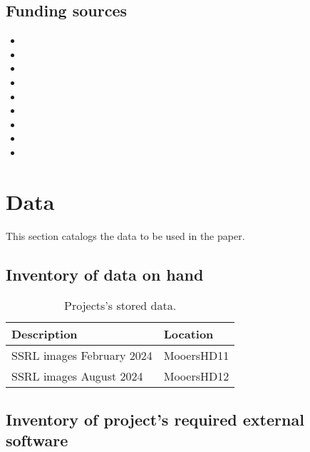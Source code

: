\documentclass[11pt,letterpaper]{article}
\begin{document}
\subsection{Funding sources}
\label{sec:orgbb2e216}

\begin{itemize}
\item 

\item 

\item 

\item 

\item 

\item 

\item 

\item 

\item 
\end{itemize}


\section{Data}
\label{sec:org0693ff0}

This section catalogs the data to be used in the paper.



\subsection{Inventory of data on hand}
\label{sec:org74d0ab8}


\begin{table}[htbp]
\caption[Stored data]{Projects's stored data.}
\centering
\begin{tabular}{ll}
Description & Location\\[0pt]
\hline
SSRL images February 2024 & MooersHD11\\[0pt]
SSRL images August 2024 & MooersHD12\\[0pt]
\end{tabular}
\end{table}



\subsection{Inventory of project's required external software}
\label{sec:org8ca4a28}
\end{document}
